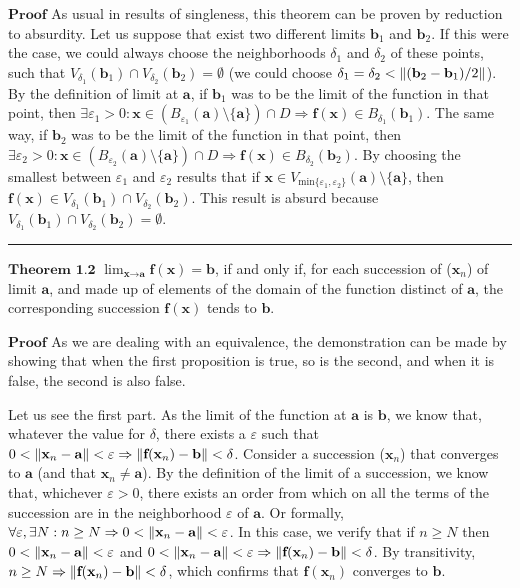 \documentclass[0pt, a4paper]{article}
\begin{document}
$\textbf{Proof}$ As usual in results of singleness, this theorem can be proven by reduction to absurdity. Let us suppose that exist two different limits $\textbf{b}_1$ and $\textbf{b}_2$. If this were the case, we could always choose the neighborhoods $\delta_1$ and $\delta_2$ of these points, such that $V_{\delta_1}(\textbf{b}_1)\cap V_{\delta_2}(\textbf{b}_2) = \emptyset$ (we could choose $\delta_1 = \delta_2 < \norm{(\textbf{b}_2-\textbf{b}_1)/2}$). By the definition of limit at $\textbf{a}$, if $\textbf{b}_1$ was to be the limit of the function in that point, then $\exists\varepsilon_1>0:\textbf{x}\in(B_{\varepsilon_1}(\textbf{a})\setminus\{\textbf{a}\})\cap D \Rightarrow \textbf{f}(\textbf{x}) \in B_{\delta_1}(\textbf{b}_1)$. The same way, if $\textbf{b}_2$ was to be the limit of the function in that point, then $\exists\varepsilon_2>0:\textbf{x}\in(B_{\varepsilon_2}(\textbf{a})\setminus\{\textbf{a}\})\cap D \Rightarrow \textbf{f}(\textbf{x}) \in B_{\delta_2}(\textbf{b}_2)$. By choosing the smallest between $\varepsilon_1$ and $\varepsilon_2$ results that if $\textbf{x} \in V_{\text{min}\{\varepsilon_1,\varepsilon_2\}}(\textbf{a})\setminus\{\textbf{a}\}$, then $\textbf{f}(\textbf{x}) \in V_{\delta_1}(\textbf{b}_1)\cap V_{\delta_2}(\textbf{b}_2)$. This result is absurd because $V_{\delta_1}(\textbf{b}_1)\cap V_{\delta_2}(\textbf{b}_2)=\emptyset$.

\noindent\rule{\textwidth}{1pt}

$\textbf{Theorem 1.2}$ $\lim_{\textbf{x}\to\textbf{a}} \textbf{f}(\textbf{x})=\textbf{b}$, if and only if, for each succession of ($\textbf{x}_n$) of limit $\textbf{a}$, and made up of elements of the domain of the function distinct of $\textbf{a}$, the corresponding succession $\textbf{f}(\textbf{x})$ tends to $\textbf{b}$.

$\textbf{Proof}$ As we are dealing with an equivalence, the demonstration can be made by showing that when the first proposition is true, so is the second, and when it is false, the second is also false.

Let us see the first part. As the limit of the function at $\textbf{a}$ is $\textbf{b}$, we know that, whatever the value for $\delta$, there exists a $\varepsilon$ such that $0<\norm{\textbf{x}_n-\textbf{a}}<\varepsilon \Rightarrow \norm{\textbf{f}(\textbf{x}_n)-\textbf{b}}<\delta$. Consider a succession ($\textbf{x}_n$) that converges to $\textbf{a}$ (and that $\textbf{x}_n\neq\textbf{a}$). By the definition of the limit of a succession, we know that, whichever $\varepsilon>0$, there exists an order from which on all the terms of the succession are in the neighborhood $\varepsilon$ of $\textbf{a}$. Or formally, $\forall\varepsilon, \exists N:n\geq N \Rightarrow 0< \norm{\textbf{x}_n-\textbf{a}}<\varepsilon$. In this case, we verify that if $n\geq N$ then $0< \norm{\textbf{x}_n-\textbf{a}}<\varepsilon$ and $0< \norm{\textbf{x}_n-\textbf{a}}<\varepsilon \Rightarrow \norm{\textbf{f}(\textbf{x}_n)-\textbf{b}}<\delta$. By transitivity, $n\geq N \Rightarrow \norm{\textbf{f}(\textbf{x}_n)-\textbf{b}}<\delta$, which confirms that $\textbf{f}(\textbf{x}_n)$ converges to $\textbf{b}$.
\end{document}
